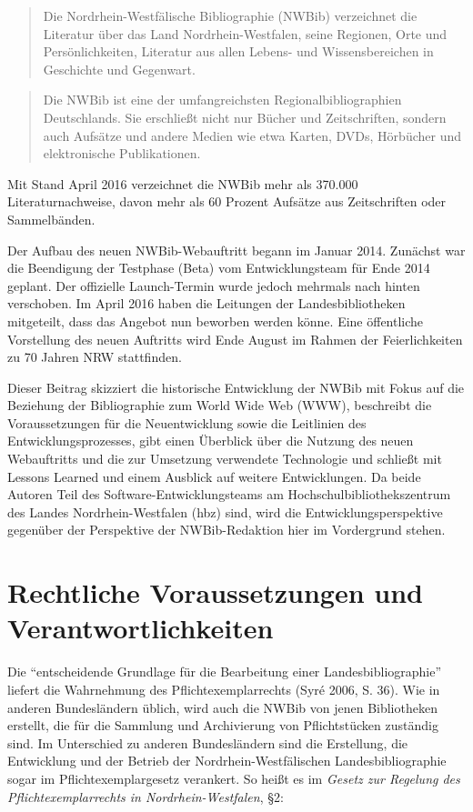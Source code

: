 \documentclass[a4paper,
fontsize=11pt,
oneside,
numbers=noperiodatend,
parskip=half-,
bibliography=totoc,
final
]{scrartcl}
\begin{document}
\begin{quote}
Die Nord\-rhein-West\-fälische Bibliographie (NWBib) verzeichnet die
Literatur über das Land Nord\-rhein-West\-falen, seine Regionen, Orte und
Persönlichkeiten, Literatur aus allen Lebens- und Wissensbereichen in
Geschichte und Gegenwart.
\end{quote}

\begin{quote}
Die NWBib ist eine der umfangreichsten Regionalbibliographien
Deutschlands. Sie erschließt nicht nur Bücher und Zeitschriften, sondern
auch Aufsätze und andere Medien wie etwa Karten, DVDs, Hörbücher und
elektronische Publikationen.
\end{quote}

Mit Stand April 2016 verzeichnet die NWBib mehr als 370.000
Literaturnachweise, davon mehr als 60 Prozent Aufsätze aus Zeitschriften
oder Sammelbänden.

Der Aufbau des neuen NWBib-Webauftritt begann im Januar 2014. Zunächst
war die Beendigung der Testphase (Beta) vom Entwicklungsteam für Ende
2014 geplant. Der offizielle Launch-Termin wurde jedoch mehrmals nach
hinten verschoben. Im April 2016 haben die Leitungen der
Landesbibliotheken mitgeteilt, dass das Angebot nun beworben werden
könne. Eine öffentliche Vorstellung des neuen Auftritts wird Ende August
im Rahmen der Feierlichkeiten zu 70 Jahren NRW stattfinden.

Dieser Beitrag skizziert die historische Entwicklung der NWBib mit Fokus
auf die Beziehung der Bibliographie zum World Wide Web (WWW), beschreibt
die Voraussetzungen für die Neuentwicklung sowie die Leitlinien des
Entwicklungsprozesses, gibt einen Überblick über die Nutzung des neuen
Webauftritts und die zur Umsetzung verwendete Technologie und schließt
mit Lessons Learned und einem Ausblick auf weitere Entwicklungen. Da
beide Autoren Teil des Software-Entwicklungsteams am
Hochschulbibliothekszentrum des Landes Nord\-rhein-West\-falen (hbz) sind,
wird die Entwicklungsperspektive gegenüber der Perspektive der
NWBib-Redaktion hier im Vordergrund stehen.

\section*{Rechtliche Voraussetzungen und
Verantwortlichkeiten}\label{rechtliche-voraussetzungen-und-verantwortlichkeiten}

Die \enquote{entscheidende Grundlage für die Bearbeitung einer
Landesbibliographie} liefert die Wahrnehmung des Pflichtexemplarrechts
(Syré 2006, S. 36). Wie in anderen Bundesländern üblich, wird auch die
NWBib von jenen Bibliotheken erstellt, die für die Sammlung und
Archivierung von Pflichtstücken zuständig sind. Im Unterschied zu
anderen Bundesländern sind die Erstellung, die Entwicklung und der
Betrieb der Nord\-rhein-West\-fälischen Landesbibliographie sogar im
Pflichtexemplargesetz verankert. So heißt es im \emph{Gesetz zur
Regelung des Pflichtexemplarrechts in Nord\-rhein-West\-falen}, §2:
\end{document}
